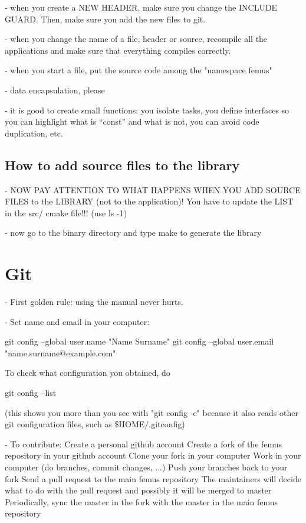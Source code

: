 \documentclass[10pt]{book}
\begin{document}
 - when you create a NEW HEADER, make sure you change the INCLUDE GUARD.
 Then, make sure you add the new files to git.
 
 - when you change the name of a file, header or source, recompile all the applications
   and make sure that everything compiles correctly.
   
 - when you start a file, put the source code among the "namespace femus"

 - data encapsulation, please
 
 - it is good to create small functions: you isolate tasks, 
   you define interfaces so you can highlight what is ``const'' and what is not,
   you can avoid code duplication, etc.
   
  \section{How to add source files to the library}
 
- NOW PAY ATTENTION TO WHAT HAPPENS WHEN YOU ADD SOURCE FILES to the LIBRARY (not to the application)! You have to 
update the LIST in the src/ cmake file!!! (use ls -1)

- now go to the binary directory and type make to generate the library


\chapter{Git}


- First golden rule: using the manual never hurts.

- Set name and email in your computer:

  git config --global user.name "Name Surname"
  git config --global user.email "name.surname@example.com"

  To check what configuration you obtained, do 

  git config --list 

  (this shows you more than you see with "git config -e"
  because it also reads other git configuration files,
  such as \$HOME/.gitconfig)

- To contribute:
  Create a personal github account 
  Create a fork of the femus repository in your github account
  Clone your fork in your computer
  Work in your computer (do branches, commit changes, ...)
  Push your branches back to your fork 
  Send a pull request to the main femus repository
  The maintainers will decide what to do with the pull request and possibly it will be merged to master
  Periodically, sync the master in the fork with the master in the main femus repository
\end{document}
